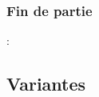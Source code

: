\documentclass[11pt]{beamer}
\newtheorem{variant}{Variante}
\begin{document}
	\begin{frame}
		\frametitle{Fin de partie}
		
		:
%		
%		
%		
	\end{frame}


\subsection{Variantes}

%		
%	
%		

%
\end{document}
